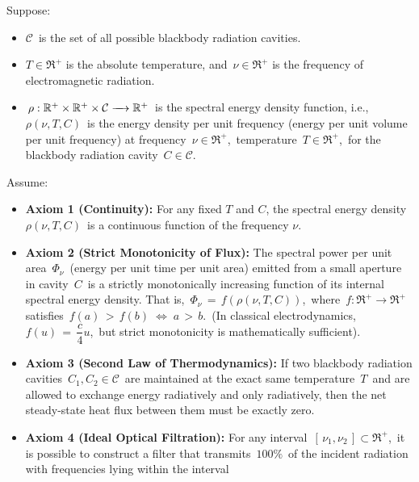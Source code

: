 \vskip 0.2cm
\begin{theorem}
\mbox{}
\vskip 0.1cm
\noindent
Suppose:
\begin{itemize}
\item
    $\mathcal{C}$\, is the set of all possible blackbody radiation cavities.
\item
    $T \in \Re^{+}$ is the absolute temperature, and
    \,$\nu \in \Re^{+}$ is the frequency of electromagnetic radiation.
\item
    \,$\rho : \Re^{+} \times \Re^{+} \times \mathcal{C} \xrightarrow{{\color{white}....}} \Re^{+}$\,
    is the spectral energy density function,
    i.e., \,$\rho(\nu, T, C)$\, is the energy density per unit frequency
    (energy per unit volume per unit frequency)
    at frequency \,$\nu \in \Re^{+}$,\, temperature \,$T \in \Re^{+}$,\,
    for the blackbody radiation cavity \,$C \in \mathcal{C}$.\,
\end{itemize}
Assume:
\begin{itemize}
\item
    \textbf{Axiom 1 (Continuity):}\;
    For any fixed $T$ and $C$, the spectral energy density
    \,$\rho(\nu, T, C)$\,
    is a continuous function of the frequency $\nu$.
\item
    \textbf{Axiom 2 (Strict Monotonicity of Flux):}\;
    The spectral power per unit area \,$\Phi_\nu$\,
    (energy per unit time per unit area)
    emitted from a small aperture in cavity \,$C$\,
    is a strictly monotonically increasing function
    of its internal spectral energy density.
    That is,
    \,$\Phi_{\nu} \, = \, f(\rho(\nu, T, C))$,\,
    where
    \,$f: \Re^{+} \to \Re^{+}$\,
    satisfies
    \,$f(a) \, > \, f(b) \;\Longleftrightarrow\; a \, > \, b$.\,
    (In classical electrodynamics,
    \,$f(u) \,=\, \dfrac{c}{4}u$,\,
    but strict monotonicity is mathematically sufficient).
\item
    \textbf{Axiom 3 (Second Law of Thermodynamics):}\;
    If two blackbody radiation cavities
    \,$C_{1}, C_{2} \in \mathcal{C}$\,
    are maintained at the exact same temperature \,$T$\, and
    are allowed to exchange energy radiatively and only radiatively,
    then the net steady-state heat flux between them must be exactly zero.
\item
    \textbf{Axiom 4 (Ideal Optical Filtration):}\;
    For any interval
    \,$[\,\nu_{1}, \nu_{2}\,] \subset \Re^{+}$,\,
    it is possible to construct a filter that transmits \,$100\%$\,
    of the incident radiation with frequencies lying within the interval

\end{itemize}
\end{theorem}
